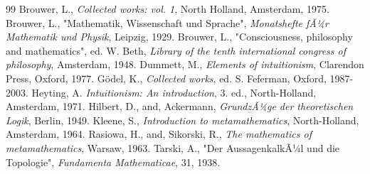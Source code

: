 \documentclass[12pt]{article}
\begin{document}
\begin{thebibliography} {99}
 Brouwer, L., \emph{Collected works: vol. 1}, North Holland, Amsterdam, 1975.
 Brouwer, L., "Mathematik, Wissenschaft und Sprache", \emph{Monatshefte fÃ¼r Mathematik und Physik}, Leipzig, 1929.
 Brouwer, L., "Consciousness, philosophy and mathematics", ed. W. Beth, \emph{Library of the tenth international congress of philosophy}, Amsterdam, 1948.
 Dummett, M., \emph{Elements of intuitionism}, Clarendon Press, Oxford, 1977.
 G\"{o}del, K., \emph{Collected works}, ed. S. Feferman, Oxford, 1987-2003.
 Heyting, A. \emph{Intuitionism: An introduction}, 3. ed., North-Holland, Amsterdam, 1971.
 Hilbert, D., and, Ackermann, \emph{GrundzÃ¼ge der theoretischen Logik}, Berlin, 1949.
 Kleene, S., \emph{Introduction to metamathematics}, North-Holland, Amsterdam, 1964.
 Rasiowa, H., and, Sikorski, R., \emph{The mathematics of metamathematics}, Warsaw, 1963.
 Tarski, A., "Der AussagenkalkÃ¼l und die Topologie", \emph{Fundamenta Mathematicae}, 31, 1938.
\end{thebibliography}
\end{document}
